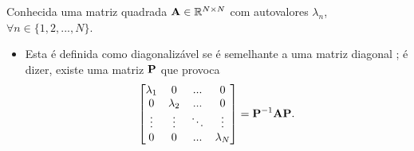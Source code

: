 \begin{definition}\label{def:diagonalization0}
Conhecida uma matriz quadrada $\MATRIX{A} \in \mathbb{R}^{N \times N}$ com
autovalores $\lambda_n$, $\forall n \in \{1, 2, ..., N\}$.
\begin{itemize}
\item Esta é definida como diagonalizável se é semelhante a uma matriz diagonal \cite[pp. 67]{golub2013matrix};
é dizer, existe uma matriz $\MATRIX{P}$ que provoca
\begin{equation}
\begin{bmatrix}
\lambda_1 & 0         & ...    & 0 \\
0         & \lambda_2 & ...    & 0 \\
\vdots    & \vdots    & \ddots & \vdots \\
0         & 0         & ...    & \lambda_N
\end{bmatrix}
=\MATRIX{P}^{-1}\MATRIX{A}\MATRIX{P}.
\end{equation}
\end{itemize}
\end{definition}


